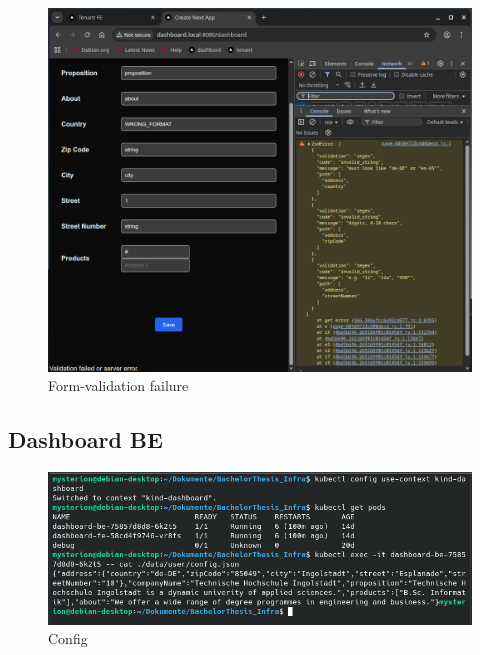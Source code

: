 \documentclass[11pt, a4paper, oneside, listof=totoc]{scrartcl}
\begin{document}
                \begin{figure}[h!]
                    \centering
                    \includegraphics[width=\textwidth]{screenshots/eval/dashboardfe/dashboardfe-validation-failure.png}
                    \caption{Form-validation failure}\label{fig:dashboardfe-form-validation-failure}
                \end{figure}

            \FloatBarrier
            \subsection{Dashboard BE}\label{appsub:dashboardbe}
                \begin{figure}[h!]
                    \centering
                    \includegraphics[width=\textwidth]{screenshots/eval/dashboardbe/dashboardbe-config.png}
                    \caption{Config}\label{fig:dashboardbe-config}
                \end{figure}
\end{document}
